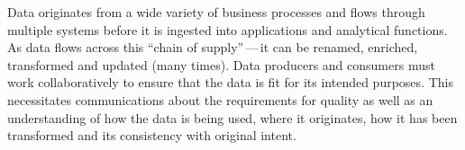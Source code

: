 %
%
Data originates from a wide variety of business processes and flows through multiple systems before it is
ingested into applications and analytical functions.
As data flows across this “chain of supply”\,---\,it can be renamed,
enriched, transformed and updated (many times).
Data producers and consumers must work collaboratively
to ensure that the data is fit for its intended purposes.
This necessitates communications about the requirements for quality as well as an understanding of
how the data is being used, where it originates, how it has been transformed and its consistency with original intent.

